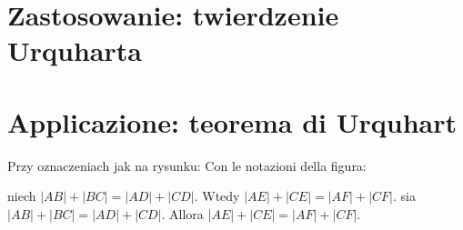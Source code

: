 %

\section{Zastosowanie: twierdzenie Urquharta} %
\section{Applicazione: teorema di Urquhart} %

\begin{theorem}
[Urquharta] %
[di Urquhart] %
\label{theorem_urquhart}%
    Przy oznaczeniach jak na rysunku: %
    Con le notazioni della figura: %
    \begin{center}

    \end{center}
    niech $|AB| + |BC| = |AD| + |CD|$. %
    Wtedy $|AE| + |CE| = |AF| + |CF|$. %
       sia $|AB| + |BC| = |AD| + |CD|$. %
    Allora $|AE| + |CE| = |AF| + |CF|$. %
\end{theorem}

